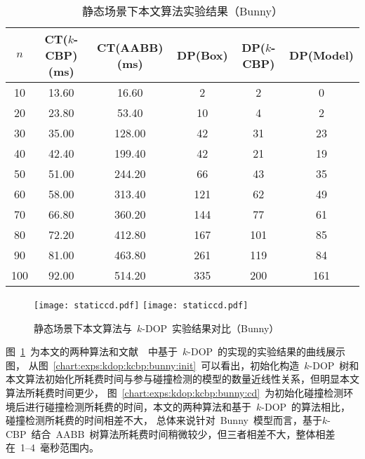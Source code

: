 \begin{table}[H]  
\centering
\caption{静态场景下本文算法实验结果（Bunny）}
\label{tab:exp:bunny:k24:kdop:kcbp:detail}
\begin{tabular}{cccccc}
\toprule[1.5pt]
$n$ & CT($k$-CBP)(ms) &  CT(AABB)(ms) & DP(Box) & DP($k$-CBP) & DP(Model)\\
\midrule[1.0pt]
10 &  13.60 &	16.60      & 2   &2   & 0  \\
20 &  23.80 &	53.40      & 10  &4   & 2  \\
30 &  35.00 &	128.00     & 42  &31  & 23 \\
40 &  42.40 &	199.40     & 42  &21  & 19 \\
50 &  51.00 &	244.20     & 66  &43  & 35 \\
60 &  58.00 &	313.40     & 121 &62  & 49 \\
70 &  66.80 &	360.20     & 144 &77  & 61 \\
80 &  72.20 &	412.80     & 167 &101 & 85 \\
90 &  81.00 &	463.80     & 261 &119 & 84 \\
100&  92.00 &	514.20     & 335 &200 & 161\\
\bottomrule[1.5pt]
\end{tabular}
\end{table}

\begin{figure}[H] 
\centering
{}
{
    \texttt{[image: staticcd.pdf]}
}
\hspace{1em}
{  
   \texttt{[image: staticcd.pdf]}
}
\caption{静态场景下本文算法与~$k$-DOP~实验结果对比（Bunny）}
\label{chart:exps:kdop:kcbp:bunny}
\end{figure}

图~\ref{chart:exps:kdop:kcbp:bunny}~为本文的两种算法和文献~~中基于~$k$-DOP~的实现的实验结果的曲线展示图，
从图~\ref{chart:exps:kdop:kcbp:bunny:init}~可以看出，初始化构造~$k$-DOP~树和本文算法初始化所耗费时间与参与碰撞检测的模型的数量近线性关系，但明显本文算法所耗费时间更少，
图~\ref{chart:exps:kdop:kcbp:bunny:cd}~为初始化碰撞检测环境后进行碰撞检测所耗费的时间，本文的两种算法和基于~$k$-DOP~的算法相比，碰撞检测所耗费的时间相差不大，
总体来说针对~Bunny~模型而言，基于$k$-CBP~结合~AABB~树算法所耗费时间稍微较少，但三者相差不大，整体相差在~1--4~毫秒范围内。

